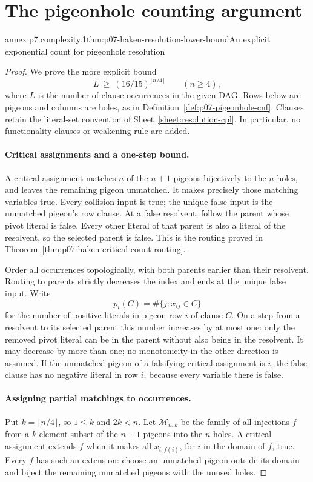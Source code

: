 \section{The pigeonhole counting argument}

\begin{annexitem}{annex:p7.complexity.1}{thm:p07-haken-resolution-lower-bound}{An explicit exponential count for pigeonhole resolution}
\begin{proof}
We prove the more explicit bound
\[
 L\ \geq\ (16/15)^{\lfloor n/4\rfloor}\qquad(n\geq4),
\]
where \(L\) is the number of clause occurrences in the given DAG.
Rows below are pigeons and columns are holes, as in
Definition~\ref{def:p07-pigeonhole-cnf}. Clauses retain the literal-set
convention of Sheet~\ref{sheet:resolution-cpl}. In particular, no
functionality clauses or weakening rule are added.

\paragraph{Critical assignments and a one-step bound.}
A critical assignment matches \(n\) of the \(n+1\) pigeons bijectively
to the \(n\) holes, and leaves the remaining pigeon unmatched. It makes
precisely those matching variables true. Every collision input is true;
the unique false input is the unmatched pigeon's row clause.
At a false resolvent, follow the parent whose pivot literal is false.
Every other literal of that parent is also a literal of the resolvent,
so the selected parent is false. This is the routing proved in
Theorem~\ref{thm:p07-haken-critical-count-routing}.

Order all occurrences topologically, with both parents earlier than their
resolvent. Routing to parents strictly decreases the index and ends at
the unique false input. Write
\[
 p_i(C)=\#\{j:x_{ij}\in C\}
\]
for the number of positive literals in pigeon row \(i\) of clause \(C\).
On a step from a resolvent to its selected parent this number increases
by at most one: only the removed pivot literal can be in the parent
without also being in the resolvent. It may decrease by more than one;
no monotonicity in the other direction is assumed. If the unmatched
pigeon of a falsifying critical assignment is \(i\), the false clause
has no negative literal in row \(i\), because every variable there is
false.

\paragraph{Assigning partial matchings to occurrences.}
Put \(k=\lfloor n/4\rfloor\), so \(1\leq k\) and \(2k<n\).
Let \(\mathcal M_{n,k}\) be the family of all injections \(f\) from
a \(k\)-element subset of the \(n+1\) pigeons into the \(n\) holes.
A critical assignment extends \(f\) when it makes all \(x_{i,f(i)}\),
for \(i\) in the domain of \(f\), true. Every \(f\) has such an extension:
choose an unmatched pigeon outside its domain and biject the remaining
unmatched pigeons with the unused holes.


\end{proof}
\end{annexitem}
